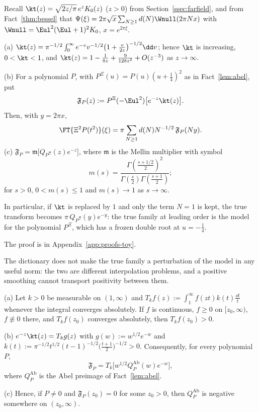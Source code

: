 Recall $\kt(z)=\sqrt{2z/\pi}\,e^{z}K_0(z)$ ($z>0$) from Section~\ref{ssec:farfield}, and from Fact~\ref{thm:bessel} that
$\Psi(\xi)=2\pi\sqrt x\sum_{N\ge1}d(N)\Wnull(2\pi Nx)$ with $\Wnull=\Eul^2(\Eul+1)^2K_0$, $x=e^{2\pi\xi}$.

\begin{proposition}\label{prop:dictionary}
\textup{(a)} $\kt(z)=\pi^{-1/2}\int_0^\infty e^{-v}v^{-1/2}\bigl(1+\tfrac{v}{2z}\bigr)^{-1/2}\dd v$; hence $\kt$ is
increasing, $0<\kt<1$, and $\kt(z)=1-\frac1{8z}+\frac9{128z^2}+O(z^{-3})$ as $z\to\infty$.

\textup{(b)} For a polynomial $P$, with $P^{\Xi}(u)=P(u)(u+\frac14)^2$ as in Fact~\ref{lem:abel}, put
\[
  \mathfrak F_P(z):=P^{\Xi}(-\Eul^2)\bigl[e^{-z}\kt(z)\bigr].
\]
Then, with $y=2\pi x$,
\begin{equation}\label{eq:dictionary}
  \FT{\Xi^2P(t^2)}(\xi)=\pi\sum_{N\ge1}d(N)N^{-1/2}\,\mathfrak F_P(Ny).
\end{equation}
\textup{(c)} $\mathfrak F_P=\mathfrak m\bigl[Q_{P^{\Xi}}(z)e^{-z}\bigr]$, where $\mathfrak m$ is the Mellin multiplier
with symbol
\[
  m(s)=\frac{\Gamma(\frac{s+1/2}{2})^2}{\Gamma(\frac s2)\Gamma(\frac{s+1}2)};
\]
for $s>0$, $0<m(s)\le1$ and $m(s)\to1$ as $s\to\infty$.

In particular, if $\kt$ is replaced by $1$ and only the term $N=1$ is kept, the true transform becomes
$\pi\,Q_{P^{\Xi}}(y)e^{-y}$: the true family at leading order is the model for the polynomial $P^{\Xi}$, which has
a frozen double root at $u=-\frac14$.
\end{proposition}

The proof is in Appendix~\ref{app:proofs-toy}.

The dictionary does not make the true family a perturbation of the model in any useful norm: the two are different
interpolation problems, and a positive smoothing cannot transport positivity between them.

\begin{proposition}\label{prop:smoothing-obstruction}
\textup{(a)} Let $k>0$ be measurable on $(1,\infty)$ and $T_kf(z):=\int_1^\infty f(zt)k(t)\frac{\dd t}{t}$ whenever
the integral converges absolutely. If $f$ is continuous, $f\ge0$ on $[z_0,\infty)$, $f\not\equiv0$ there, and
$T_kf(z_0)$ converges absolutely, then $T_kf(z_0)>0$.

\textup{(b)} $e^{-z}\kt(z)=T_kg(z)$ with $g(w):=w^{1/2}e^{-w}$ and
$k(t):=\pi^{-1/2}t^{1/2}(t-1)^{-1/2}\bigl(\frac{t+1}2\bigr)^{-1/2}>0$. Consequently, for every polynomial $P$,
\[
  \mathfrak F_P=T_k\bigl[w^{1/2}Q^{\mathrm{Ab}}_P(w)e^{-w}\bigr],
\]
where $Q^{\mathrm{Ab}}_P$ is the Abel preimage of Fact~\ref{lem:abel}.

\textup{(c)} Hence, if $P\neq0$ and $\mathfrak F_P(z_0)=0$ for some $z_0>0$, then $Q^{\mathrm{Ab}}_P$ is negative
somewhere on $(z_0,\infty)$.
\end{proposition}

